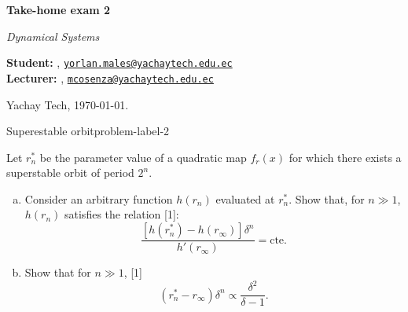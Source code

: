 





\textsf{\LARGE{\textbf{Take-home exam 2}}}

\normalsize{\textit{Dynamical Systems}}

\vspace{1ex}

\textsf{\textbf{Student:}} , 
\href{mailto:yorlan.males@yachaytech.edu.ec}{\texttt{yorlan.males@yachaytech.edu.ec}}\\
\textsf{\textbf{Lecturer:}} , 
\href{mcosenza@yachaytech.edu.ec}{\texttt{mcosenza@yachaytech.edu.ec}}

Yachay Tech, \today.

\vspace{2ex}



\begin{problem}{Superestable orbit}{problem-label-2}

Let $r_n^*$ be the parameter value of a quadratic map $f_r(x)$ for which there
exists a superstable orbit of period $2^n$.

\begin{enumerate}[(a)]
    \item Consider an arbitrary function $h(r_n)$ evaluated at $r_n^*$. Show that, 
    for $n \gg 1$, $h(r_n)$ satisfies the relation [1]:
    \[
        \frac{[h(r_n^*)-h(r_{\infty})]\delta^n}{h'(r_{\infty})} = \text{cte.}
    \]
    \item Show that for $ n \gg 1$, [1]
    \[
        (r_n^*-r_{\infty})\delta^n \propto \frac{\delta^2}{\delta -1}.
    \]
\end{enumerate}
\end{problem}

